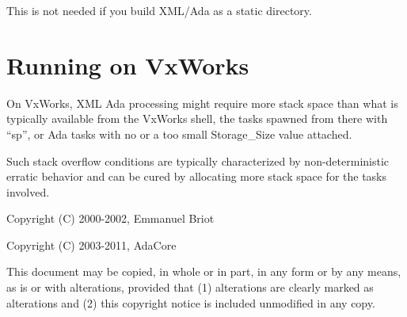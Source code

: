 \documentclass[letterpaper,10pt,english]{sphinxmanual}
\begin{document}
This is not needed if you build XML/Ada as a static directory.


\section{Running on VxWorks}
\label{using:running-on-vxworks}
On VxWorks, XML Ada processing might require more stack space than what is
typically available from the VxWorks shell, the tasks spawned from there with
``sp'', or Ada tasks with no or a too small Storage\_Size value attached.

Such stack overflow conditions are typically characterized by non-deterministic
erratic behavior and can be cured by allocating more stack space for the tasks
involved.

Copyright (C) 2000-2002, Emmanuel Briot

Copyright (C) 2003-2011, AdaCore

This document may be copied, in whole or in part, in any form or by any
means, as is or with alterations, provided that (1) alterations are clearly
marked as alterations and (2) this copyright notice is included
unmodified in any copy.



\renewcommand{\indexname}{Index}
\printindex
\end{document}
